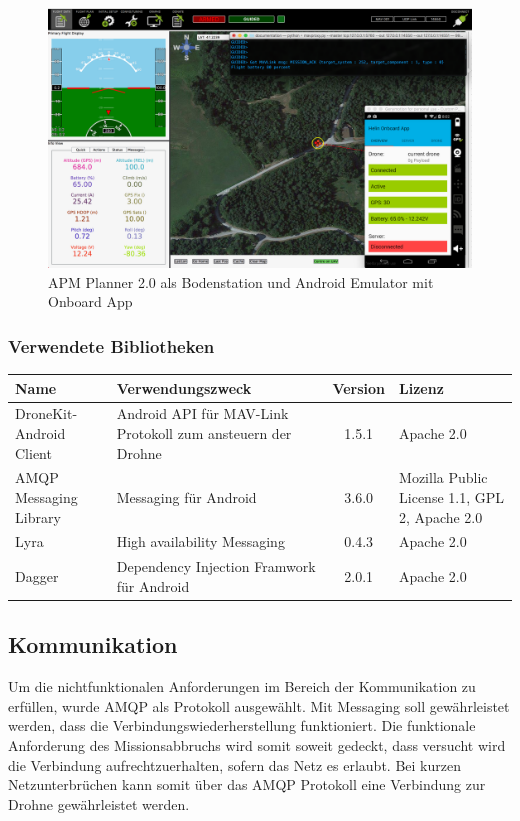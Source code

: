 \begin{figure}[H]
	\includegraphics[width=1.0\textwidth]{images/test-setup-onboard.png}
	\caption{APM Planner 2.0 als Bodenstation und Android Emulator mit Onboard App}
	\label{fig:test-setup-onboard}
\end{figure}

\subsubsection{Verwendete Bibliotheken}
\begin{tabularx}{\textwidth}{|X|X|c|X|}
	\hline
	\textbf{Name} & \textbf{Verwendungszweck} & \textbf{Version} & \textbf{Lizenz} \\
	\hline \hline
	DroneKit-Android Client & Android API für MAV-Link Protokoll zum ansteuern der Drohne & 1.5.1 & Apache 2.0\\
	\hline 
	AMQP Messaging Library & Messaging für Android & 3.6.0 &  Mozilla Public License 1.1, GPL 2,  Apache 2.0 \\
	\hline 
	Lyra  & High availability Messaging & 0.4.3 &  Apache 2.0 \\
	\hline 
	Dagger  & Dependency Injection Framwork für Android & 2.0.1 &  Apache 2.0 \\
	\hline 
\end{tabularx}

\subsection{Kommunikation}
Um die nichtfunktionalen Anforderungen im Bereich der Kommunikation zu erfüllen, wurde AMQP als Protokoll ausgewählt. Mit Messaging soll gewährleistet werden, dass die Verbindungswiederherstellung funktioniert. Die funktionale Anforderung des Missionsabbruchs wird somit soweit gedeckt, dass versucht wird die Verbindung aufrechtzuerhalten, sofern das Netz es erlaubt. Bei kurzen Netzunterbrüchen kann somit über das AMQP Protokoll eine Verbindung zur Drohne gewährleistet werden.

